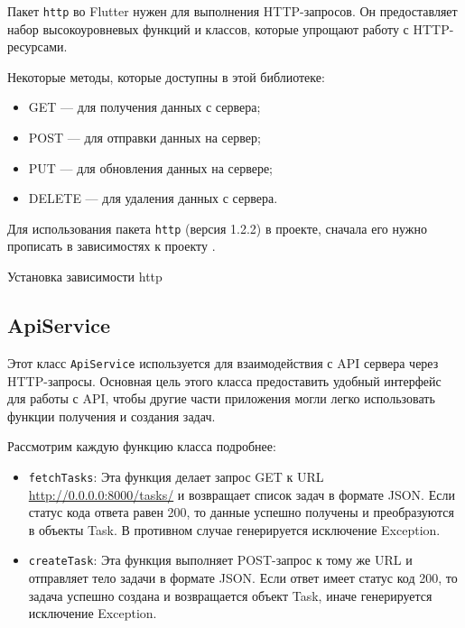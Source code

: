 Пакет \texttt{http} во Flutter нужен для выполнения HTTP-запросов.
Он предоставляет набор высокоуровневых функций и классов,
которые упрощают работу с HTTP-ресурсами.

Некоторые методы, которые доступны в этой библиотеке:

\begin{itemize}
	\item GET --- для получения данных с сервера;
	\item POST --- для отправки данных на сервер;
	\item PUT --- для обновления данных на сервере;
	\item DELETE --- для удаления данных с сервера.
\end{itemize}

Для использования пакета \texttt{http} (версия 1.2.2) в проекте,
сначала его нужно прописать в зависимостях к проекту .

\begin{image}
	\caption{Установка зависимости http}
	\label{fig:http}
\end{image}

\subsection{ApiService}

Этот класс \texttt{ApiService} 
используется для взаимодействия с API сервера через HTTP-запросы.
Основная цель этого класса предоставить удобный интерфейс для работы с API,
чтобы другие части приложения могли легко использовать функции получения
и создания задач. 

\break

Рассмотрим каждую функцию класса подробнее:

\begin{itemize}
	\item \texttt{fetchTasks}:
		Эта функция делает запрос GET
		к URL \url{http://0.0.0.0:8000/tasks/}
		и возвращает список задач в формате JSON.
		Если статус кода ответа равен 200,
		то данные успешно получены и преобразуются в объекты Task.
		В противном случае генерируется исключение Exception.
	\item \texttt{createTask}:
		Эта функция выполняет POST-запрос к тому же URL
		и отправляет тело задачи в формате JSON.
		Если ответ имеет статус код 200,
		то задача успешно создана и возвращается объект Task,
		иначе генерируется исключение Exception.
\end{itemize}

